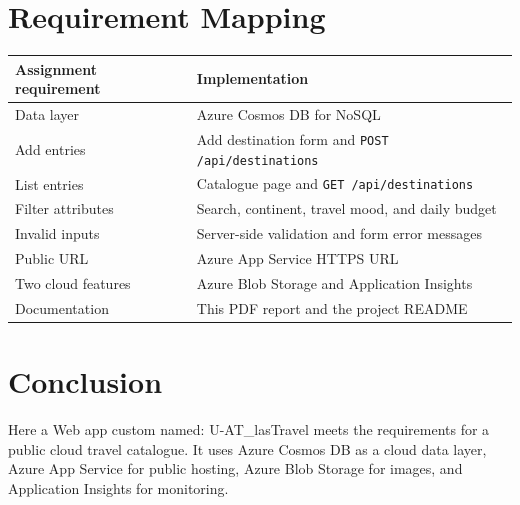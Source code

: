 \documentclass[12pt,a4paper]{article}
\begin{document}
\section{Requirement Mapping}

\begin{tabular}{p{} p{}}
\toprule
Assignment requirement & Implementation \\
\midrule
Data layer & Azure Cosmos DB for NoSQL \\
Add entries & Add destination form and \texttt{POST /api/destinations} \\
List entries & Catalogue page and \texttt{GET /api/destinations} \\
Filter attributes & Search, continent, travel mood, and daily budget \\
Invalid inputs & Server-side validation and form error messages \\
Public URL & Azure App Service HTTPS URL \\
Two cloud features & Azure Blob Storage and Application Insights \\
Documentation & This PDF report and the project README \\
\bottomrule
\end{tabular}

\section{Conclusion}

Here a Web app custom named: U-AT\_lasTravel meets the requirements for a public cloud travel catalogue. It uses Azure Cosmos DB as a cloud data layer, Azure App Service for public hosting, Azure Blob Storage for images, and Application Insights for monitoring.
\end{document}
